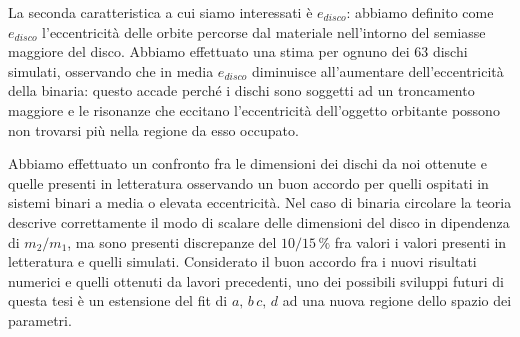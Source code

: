\documentclass[12pt, a4paper]{report}
\begin{document}
La seconda caratteristica a cui siamo interessati è $e_{disco}$: abbiamo definito come $e_{disco}$ l'eccentricità delle orbite percorse dal materiale nell'intorno del semiasse maggiore del disco.
Abbiamo effettuato una stima per ognuno dei 63 dischi simulati, osservando che in media $e_{disco}$ diminuisce all'aumentare dell'eccentricità della binaria: questo accade perché i dischi sono soggetti ad un troncamento maggiore e le risonanze che eccitano l'eccentricità dell'oggetto orbitante possono non trovarsi più nella regione da esso occupato.

Abbiamo effettuato un confronto fra le dimensioni dei dischi da noi ottenute e quelle presenti in letteratura osservando un buon accordo per quelli ospitati in sistemi binari a media o elevata eccentricità. 
Nel caso di binaria circolare la teoria descrive correttamente il modo di scalare delle dimensioni del disco in dipendenza di $m_2/m_1$, ma sono presenti discrepanze del $10/15\,\%$ fra valori i valori presenti in letteratura e quelli simulati.
Considerato il buon accordo fra i nuovi risultati numerici e quelli ottenuti da lavori precedenti, uno dei possibili sviluppi futuri di questa tesi è un estensione del fit di $a,\,b\,c,\,d$ ad una nuova regione dello spazio dei parametri.
\end{document}
